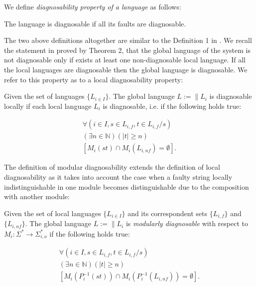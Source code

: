 \documentclass[letterpaper, 10pt, conference]{ieeeconf}
\begin{document}
We define \emph{diagnosability property of a language} as follows:
\begin{definition}
The language is diagnosable if all its faults are diagnosable.
\end{definition}
The two above definitions altogether are similar to the Definition 1 in
\cite{sampath_diagnosability_1995}. We recall the statement in
\cite{contant_diagnosability_2006} proved by Theorem 2, that the global
language of the system is not diagnosable only if exists at least one non-diagnosable
local language. If all the local languages are diagnosable then the global
language is diagnosable. We refer to this property as to a local diagnosability
property:

\begin{definition} Given the set of languages
$\{L_{i \in I}\}$. The global language $L := \parallel L_i$ is
diagnosable locally if each local language $L_i$ is diagnosable, i.e. if
the following holds true:
\end{definition}
\begin{equation}
\begin{array}{l}
	\forall(i \in I, s \in L_{i,f}, t \in L_{i,f}/s)
	\\
	(\exists n \in \mathbb{N})
	(|t| \geq n)
	\\
	\left[ M_i(st) \cap M_i(L_{i,nf}) = \emptyset \right].
\end{array}
\end{equation}

The definition of modular diagnosability extends the definition of local
diagnosability as it takes into account the case when a faulty string locally
indistinguishable in one module becomes distinguishable due to the
composition with another module:

\begin{definition} Given the set of local languages
$\{L_{i \in I}\}$ and its correspondent sets $\{L_{i,f}\}$ and
$\{L_{i,nf}\}$. The global language $L := \parallel L_i$ is \emph{modularly
diagnosable} with respect to
$M_i: \Sigma^* \rightarrow \Sigma_{i,o}^*$ 
if the following holds true:
\end{definition}
\begin{equation}
\begin{array}{l}
	\forall(i \in I, s \in L_{i,f}, t \in L_{i,f}/s)
	\\
	(\exists n \in \mathbb{N})
	(|t| \geq n)
	\\
	\left[ M_i(P_i^{-1}(st)) \cap M_i(P_i^{-1}(L_{i,nf})) = \emptyset \right].
\end{array}
\end{equation}
\end{document}
